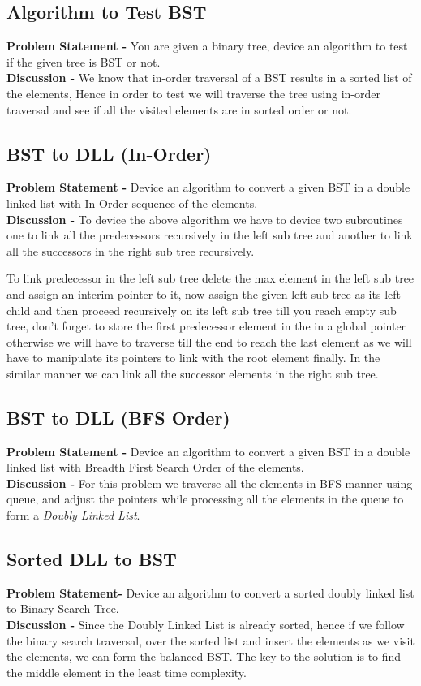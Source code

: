 \documentclass[12pt,a4paper,draft]{article}
\begin{document}
\subsection{Algorithm to Test BST}
\textbf{Problem Statement -} You are given a binary tree, device an algorithm to test if the given tree is BST or not.
\\
\textbf{Discussion -} We know that in-order traversal of a BST results in a sorted list of the elements, Hence in order to test we will traverse the tree using in-order traversal and see if all the visited elements are in sorted order or not.
\subsection{BST to DLL (In-Order)}
\textbf{Problem Statement -} Device an algorithm to convert a given BST in a double linked list with In-Order sequence of the elements.
\\
\textbf{Discussion -} To device the above algorithm we have to device two subroutines one to link all the predecessors recursively in the left sub tree and another to link all the successors in the right sub tree recursively.
\par
To link predecessor in the left sub tree delete the max element in the left sub tree and assign an interim pointer to it, now assign the given left sub tree as its left child and then proceed recursively on its left sub tree till you reach empty sub tree, don't forget to store the first predecessor element in the in a global pointer otherwise we will have to traverse till the end to reach the last element as we will have to manipulate its pointers to link with the root element finally. In the similar manner we can link all the successor elements in the right sub tree.
\subsection{BST to DLL (BFS Order)}
\textbf{Problem Statement -} Device an algorithm to convert a given BST in a double linked list with Breadth First Search Order of the elements.
\\
\textbf{Discussion -} For this problem we traverse all the elements in BFS manner using queue, and adjust the pointers while processing all the elements in the queue to form a \emph{Doubly Linked List}.
\subsection{Sorted DLL to BST}
\textbf{Problem Statement-} Device an algorithm to convert a sorted doubly linked list to Binary Search Tree.
\\
\textbf{Discussion -} Since the Doubly Linked List is already sorted, hence if we follow the binary search traversal, over the sorted list and insert the elements as we visit the elements, we can form the balanced BST. The key to the solution is to find the middle element in the least time complexity.
\end{document}
